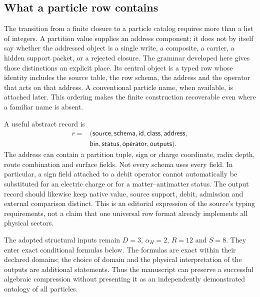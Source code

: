 \label{v2c2:chapter}

\subsection{What a particle row contains}

The transition from a finite closure to a particle catalog requires more than a list of integers. A partition value supplies an address component; it does not by itself say whether the addressed object is a single write, a composite, a carrier, a hidden support packet, or a rejected closure. The grammar developed here gives those distinctions an explicit place. Its central object is a typed row whose identity includes the source table, the row schema, the address and the operator that acts on that address. A conventional particle name, when available, is attached later. This ordering makes the finite construction recoverable even where a familiar name is absent.

A useful abstract record is
\begin{equation}
\begin{split}
r={}&(\mathsf{source},\mathsf{schema},\mathsf{id},\mathsf{class},\mathsf{address},\\
 &\mathsf{bin},\mathsf{status},\mathsf{operator},\mathsf{outputs}).
\end{split}
\label{v2c2:row}
\end{equation}
The address can contain a partition tuple, sign or charge coordinate, radix depth, route combination and surface fields. Not every schema uses every field. In particular, a sign field attached to a debit operator cannot automatically be substituted for an electric charge or for a matter--antimatter status. The output record should likewise keep native value, source support, debit, admission and external comparison distinct. This is an editorial expression of the source's typing requirements, not a claim that one universal row format already implements all physical sectors.

The adopted structural inputs remain $D=3$, $\alpha_H=2$, $R=12$ and $S=8$. They enter exact conditional formulas below. The formulas are exact within their declared domains; the choice of domain and the physical interpretation of the outputs are additional statements. Thus the manuscript can preserve a successful algebraic compression without presenting it as an independently demonstrated ontology of all particles.

